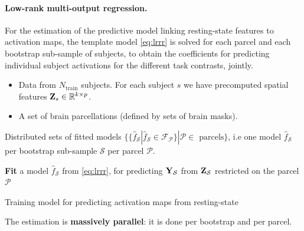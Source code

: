 \paragraph{Low-rank multi-output regression.}
For the estimation of the predictive model
linking resting-state features to activation maps, the template model
\eqref{eq:lrrr} is solved for each parcel and each bootstrap sub-sample of
subjects, to obtain the coefficients for predicting individual subject
activations for the different task contrasts, jointly.
%
\begin{algorithm}
  \begin{algorithmic}[1]
    \Require
    \begin{itemize}
    \item Data from $N_{\text{train}}$ subjects. For each subject $s$ we have
      precomputed spatial features $\mathbf{Z}_s \in \mathbb R^{k \times p}$.
      
      
      \item A set of brain parcellations (defined by sets of brain masks).
      \end{itemize}
    \Ensure Distributed sets of fitted models $\{\{\hat{f}_{\mathcal S}|\hat{f}_{\mathcal S} \in
    \mathcal F_{\mathcal P}\} | \mathcal P \in \text{ parcels}\}$,
    i.e one model $\hat{f}_{\mathcal S}$ per bootstrap sub-sample  $\mathcal S$ per parcel
    $\mathcal P$.
  
  \State  \textbf{Fit} a model $\hat{f}_{\mathcal S}$ from \eqref{eq:lrrr}, for predicting $\mathbf{Y}_{\mathcal S}$ from
  $\mathbf{Z}_{\mathcal S}$ restricted on the parcel $\mathcal P$
\EndParFor

\EndParFor
\end{algorithmic}
\caption{Training model for predicting activation maps from resting-state}
\label{Tab:algfit}
\end{algorithm}
The estimation is \textbf{massively parallel}:
it is done per bootstrap and per parcel.


